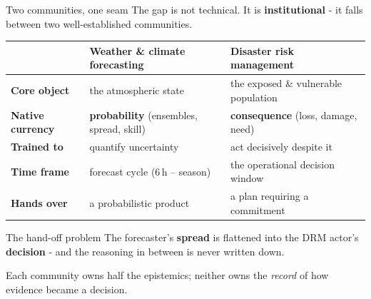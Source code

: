 \documentclass[aspectratio=3218]{beamer}
\begin{document}
\begin{frame}{Two communities, one seam}
	The gap is not technical. It is \textbf{institutional} - it falls between two
	well-established communities.
	\begin{center}\small
	\begin{tabular}{@{}lp{4.6cm}p{4.6cm}@{}}
		\toprule
		 & \textbf{Weather \& climate forecasting} & \textbf{Disaster risk management} \\
		\midrule
		\textbf{Core object} & the atmospheric state & the exposed \& vulnerable population \\
		\textbf{Native currency} & \textbf{probability} (ensembles, spread, skill) & \textbf{consequence} (loss, damage, need) \\
		\textbf{Trained to} & quantify uncertainty & act decisively despite it \\
		\textbf{Time frame} & forecast cycle (6\,h -- season) & the operational decision window \\
		\textbf{Hands over} & a probabilistic product & a plan requiring a commitment \\
		\bottomrule
	\end{tabular}
	\end{center}
	\begin{block}{The hand-off problem}
		\centering
		The forecaster's \textbf{spread} is flattened into the DRM
		actor's \textbf{decision} - and the reasoning in between is never written
		down.
	\end{block}
	\centering\footnotesize
	Each community owns half the epistemics; neither owns the \emph{record} of
	how evidence became a decision.
\end{frame}
\end{document}
